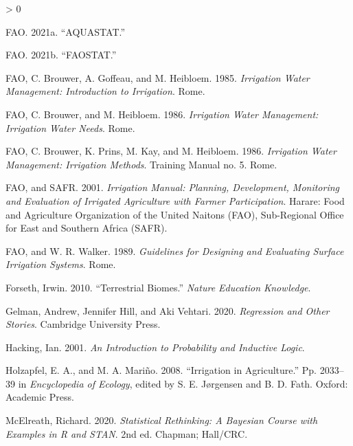 \documentclass[12pt,twoside]{reedthesis}
\newlength{\cslhangindent}
\newenvironment{CSLReferences}[2] %
 {%
  \setlength{\parindent}{0pt}
  \ifodd #1 \everypar{\setlength{\hangindent}{\cslhangindent}}\ignorespaces\fi
  \ifnum #2 > 0
  \setlength{\parskip}{#2\baselineskip}
  \fi
 }%
 {}
\begin{document}
\begin{CSLReferences}{1}{0}
\leavevmode\hypertarget{ref-faoAQUASTAT2021}{}%
FAO. 2021a. {``{AQUASTAT}.''}

\leavevmode\hypertarget{ref-faoFAOSTAT2021}{}%
FAO. 2021b. {``{FAOSTAT}.''}

\leavevmode\hypertarget{ref-faoIrrigationWaterManagement1985}{}%
FAO, C. Brouwer, A. Goffeau, and M. Heibloem. 1985. \emph{Irrigation {Water Management}: {Introduction} to {Irrigation}}. {Rome}.

\leavevmode\hypertarget{ref-faoIrrigationWaterManagement1986a}{}%
FAO, C. Brouwer, and M. Heibloem. 1986. \emph{Irrigation {Water Management}: {Irrigation Water Needs}}. {Rome}.

\leavevmode\hypertarget{ref-faoIrrigationWaterManagement1986}{}%
FAO, C. Brouwer, K. Prins, M. Kay, and M. Heibloem. 1986. \emph{Irrigation {Water Management}: {Irrigation Methods}}. Training Manual no. 5. {Rome}.

\leavevmode\hypertarget{ref-faoIrrigationManualPlanning2001}{}%
FAO, and SAFR. 2001. \emph{Irrigation Manual: Planning, Development, Monitoring and Evaluation of Irrigated Agriculture with Farmer Participation}. {Harare}: {Food and Agriculture Organization of the United Naitons (FAO), Sub-Regional Office for East and Southern Africa (SAFR)}.

\leavevmode\hypertarget{ref-faoGuidelinesDesigningEvaluating1989}{}%
FAO, and W. R. Walker. 1989. \emph{Guidelines for Designing and Evaluating Surface Irrigation Systems}. {Rome}.

\leavevmode\hypertarget{ref-forsethTerrestrialBiomes2010}{}%
Forseth, Irwin. 2010. {``Terrestrial {Biomes}.''} \emph{Nature Education Knowledge}.

\leavevmode\hypertarget{ref-gelman2020}{}%
Gelman, Andrew, Jennifer Hill, and Aki Vehtari. 2020. \emph{Regression and Other Stories}. Cambridge University Press.

\leavevmode\hypertarget{ref-hackingIntroductionProbabilityInductive2001}{}%
Hacking, Ian. 2001. \emph{An {Introduction} to {Probability} and {Inductive Logic}}.

\leavevmode\hypertarget{ref-holzapfelIrrigationAgriculture2008}{}%
Holzapfel, E. A., and M. A. Mariño. 2008. {``Irrigation in {Agriculture}.''} Pp. 2033--39 in \emph{Encyclopedia of {Ecology}}, edited by S. E. Jørgensen and B. D. Fath. {Oxford}: {Academic Press}.

\leavevmode\hypertarget{ref-mcelreath2020}{}%
McElreath, Richard. 2020. \emph{Statistical Rethinking: A Bayesian Course with Examples in R and STAN}. 2nd ed. Chapman; Hall/CRC.


\end{CSLReferences}
\end{document}
